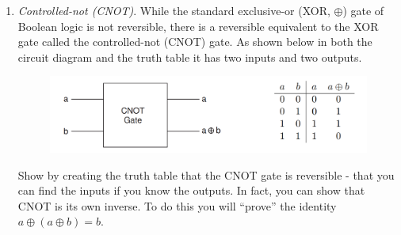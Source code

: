 \documentclass{book}
\theoremstyle{definition}
\begin{document}
\begin{enumerate}
	\item \textit{Controlled-not (CNOT)}. While the standard exclusive-or (XOR, $\oplus$) gate of Boolean logic
	is not reversible, there is a reversible equivalent to the XOR gate called the controlled-not (CNOT) gate. As shown below in both the circuit diagram and the truth table it
	has two inputs and two outputs.
	\begin{figure}[!htb]
		\centering
		\includegraphics[scale=0.25]{cnot}
	\end{figure}
	Show by creating the truth table that the CNOT gate is reversible - that you can find
	the inputs if you know the outputs. In fact, you can show that CNOT is its own inverse.
	To do this you will ``prove'' the identity $a \oplus (a \oplus b) = b$.


\end{enumerate}
\end{document}
